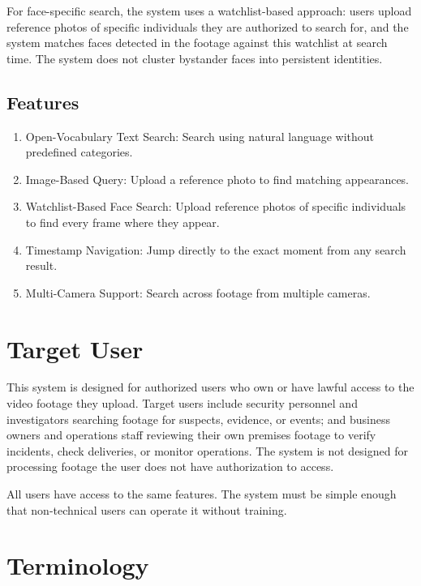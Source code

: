 For face-specific search, the system uses a watchlist-based approach: users upload reference photos of specific individuals they are authorized to search for, and the system matches faces detected in the footage against this watchlist at search time. The system does not cluster bystander faces into persistent identities.

\subsection{Features}
\label{subsection:features}

\begin{enumerate}[leftmargin=80pt]
    \item Open-Vocabulary Text Search: Search using natural language without predefined categories.
    \item Image-Based Query: Upload a reference photo to find matching appearances.
    \item Watchlist-Based Face Search: Upload reference photos of specific individuals to find every frame where they appear.
    \item Timestamp Navigation: Jump directly to the exact moment from any search result.
    \item Multi-Camera Support: Search across footage from multiple cameras.
\end{enumerate}

\section{Target User}
\label{section:target-user}

This system is designed for authorized users who own or have lawful access to the video footage they upload. Target users include security personnel and investigators searching footage for suspects, evidence, or events; and business owners and operations staff reviewing their own premises footage to verify incidents, check deliveries, or monitor operations. The system is not designed for processing footage the user does not have authorization to access.

All users have access to the same features. The system must be simple enough that non-technical users can operate it without training.

\section{Terminology}
\label{section:terminology}


